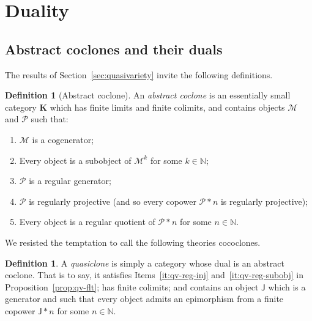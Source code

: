 \documentclass[11pt, a4paper, twoside,leqno]{amsart}
\newcommand{\cat}[1]{\mathbf{#1}}
\numberwithin{equation}{section}
\theoremstyle{plain}
\theoremstyle{definition}
\newtheorem{Defn}[Thm]{Definition}
\begin{document}
\section{Duality}
\label{sec:duality}

\subsection{Abstract coclones and their duals}
\label{sec:ARClo-QClo}

The results of Section~\ref{sec:quasivariety} invite the following
definitions.

\begin{Defn}[Abstract coclone]
  \label{def:arc}
  An \emph{abstract coclone} is an essentially small category
  \(\cat{K}\) which has
  finite limits and finite colimits, and contains objects
  \(\mathcal{M}\) and \(\mathcal{P}\) such that: 
  \begin{enumerate}[label=(\alph*), ref=(\alph*)]
  \item
    \label{it:arc-cogen}
    \(\mathcal{M}\) is a cogenerator;

    \item
    \label{it:arc-sub-J}
    Every object is a subobject of \(\mathcal{M}^{k}\) for some \(k \in
    \mathbb{N}\);
    
  \item
    \label{it:arc-reg-gen}
    \(\mathcal{P}\) is a regular generator;
    
  \item 
    \label{it:arc-reg-proj}
    \(\mathcal{P}\) is regularly projective (and so every copower \(\mathcal{P}\ast n\) is
    regularly projective);

  \item
    \label{it:arc-reg-quot}
    Every object is a regular quotient of \(\mathcal{P}\ast n\) for some
    \(n \in \mathbb{N}\).  
  \end{enumerate}
\end{Defn}

We resisted the temptation to call the following theories cococlones.
\begin{Defn}
  \label{def:quasiclone}
  A \emph{quasiclone} is simply a category whose dual is an abstract
  coclone. That is to say, it 
  satisfies Items~\ref{it:qv-reg-inj}
  and~\ref{it:qv-reg-subobj} in Proposition~\ref{prop:qv-flt}; has
  finite colimits; and contains an object \(\mathsf{J}\) which is a
  generator and such that
  every object admits an epimorphism from a finite copower
  \(\mathsf{J}\ast n\) for some \(n\in \mathbb{N}
  \).
\end{Defn}
\end{document}
